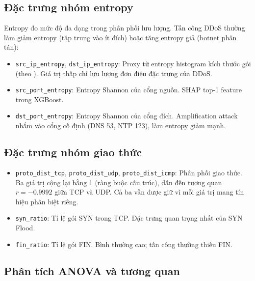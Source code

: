 \documentclass[12pt,a4paper]{article}
\begin{document}
\subsection{Đặc trưng nhóm entropy}

Entropy đo mức độ đa dạng trong phân phối lưu lượng. Tấn công DDoS thường làm giảm entropy (tập trung vào ít đích) hoặc tăng entropy giả (botnet phân tán):

\begin{itemize}[leftmargin=2em]
\item \texttt{src\_ip\_entropy}, \texttt{dst\_ip\_entropy}: Proxy từ entropy histogram kích thước gói (theo \cite{cicdos2019_features}). Giá trị thấp chỉ lưu lượng đơn điệu đặc trưng của DDoS.
\item \texttt{src\_port\_entropy}: Entropy Shannon của cổng nguồn. SHAP top-1 feature trong XGBoost.
\item \texttt{dst\_port\_entropy}: Entropy Shannon của cổng đích. Amplification attack nhắm vào cổng cố định (DNS 53, NTP 123), làm entropy giảm mạnh.
\end{itemize}

\subsection{Đặc trưng nhóm giao thức}

\begin{itemize}[leftmargin=2em]
\item \texttt{proto\_dist\_tcp}, \texttt{proto\_dist\_udp}, \texttt{proto\_dist\_icmp}: Phân phối giao thức. Ba giá trị cộng lại bằng 1 (ràng buộc cấu trúc), dẫn đến tương quan $r = -0.9992$ giữa TCP và UDP. Cả ba vẫn được giữ vì mỗi giá trị mang tín hiệu phân biệt riêng.
\item \texttt{syn\_ratio}: Tỉ lệ gói SYN trong TCP. Đặc trưng quan trọng nhất của SYN Flood.
\item \texttt{fin\_ratio}: Tỉ lệ gói FIN. Bình thường cao; tấn công thường thiếu FIN.
\end{itemize}

\subsection{Phân tích ANOVA và tương quan}
\end{document}

